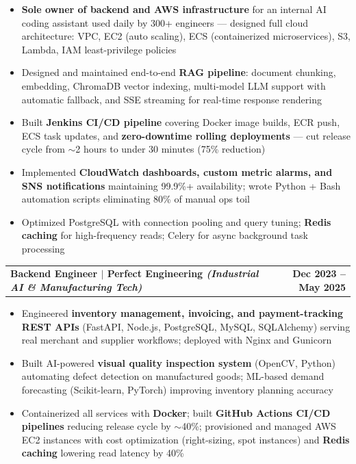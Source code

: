\documentclass[a4paper,10pt]{article}
\begin{document}
\begin{itemize}
\item \textbf{Sole owner of backend and AWS infrastructure} for an internal AI coding assistant used daily by 300+ engineers --- designed full cloud architecture: VPC, EC2 (auto scaling), ECS (containerized microservices), S3, Lambda, IAM least-privilege policies
\item Designed and maintained end-to-end \textbf{RAG pipeline}: document chunking, embedding, ChromaDB vector indexing, multi-model LLM support with automatic fallback, and SSE streaming for real-time response rendering
\item Built \textbf{Jenkins CI/CD pipeline} covering Docker image builds, ECR push, ECS task updates, and \textbf{zero-downtime rolling deployments} --- cut release cycle from $\sim$2 hours to under 30 minutes (75\% reduction)
\item Implemented \textbf{CloudWatch dashboards, custom metric alarms, and SNS notifications} maintaining 99.9\%+ availability; wrote Python + Bash automation scripts eliminating 80\% of manual ops toil
\item Optimized PostgreSQL with connection pooling and query tuning; \textbf{Redis caching} for high-frequency reads; Celery for async background task processing
\end{itemize}

\begin{tabularx}{\linewidth}{@{}X r@{}}
\textbf{Backend Engineer $|$ Perfect Engineering \textit{(Industrial AI \& Manufacturing Tech)}} &
\textbf{Dec 2023 -- May 2025}
\end{tabularx}

\begin{itemize}
\item Engineered \textbf{inventory management, invoicing, and payment-tracking REST APIs} (FastAPI, Node.js, PostgreSQL, MySQL, SQLAlchemy) serving real merchant and supplier workflows; deployed with Nginx and Gunicorn
\item Built AI-powered \textbf{visual quality inspection system} (OpenCV, Python) automating defect detection on manufactured goods; ML-based demand forecasting (Scikit-learn, PyTorch) improving inventory planning accuracy
\item Containerized all services with \textbf{Docker}; built \textbf{GitHub Actions CI/CD pipelines} reducing release cycle by $\sim$40\%; provisioned and managed AWS EC2 instances with cost optimization (right-sizing, spot instances) and \textbf{Redis caching} lowering read latency by 40\%
\end{itemize}
\end{document}
